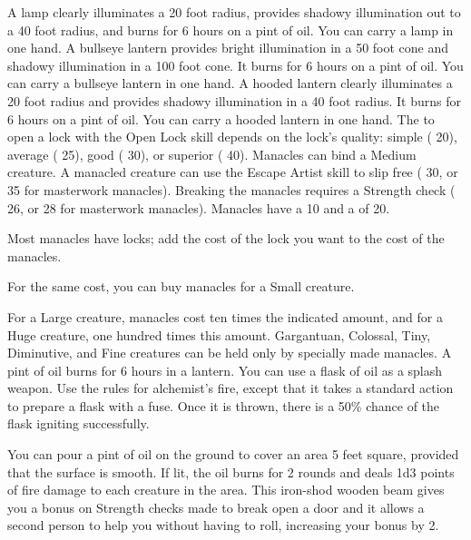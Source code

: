          A lamp clearly illuminates a 20 foot radius, provides shadowy illumination out to a 40 foot radius, and burns for 6 hours on a pint of oil. You can carry a lamp in one hand.
         A bullseye lantern provides bright illumination in a 50 foot cone and shadowy illumination in a 100 foot cone. It burns for 6 hours on a pint of oil. You can carry a bullseye lantern in one hand.
         A hooded lantern clearly illuminates a 20 foot radius and provides shadowy illumination in a 40 foot radius. It burns for 6 hours on a pint of oil. You can carry a hooded lantern in one hand.
         The  to open a lock with the Open Lock skill depends on the lock's quality: simple ( 20), average ( 25), good ( 30), or superior ( 40).
         Manacles can bind a Medium creature. A manacled creature can use the Escape Artist skill to slip free ( 30, or  35 for masterwork manacles). Breaking the manacles requires a Strength check ( 26, or  28 for masterwork manacles). Manacles have a  10 and a  of 20.
        \par Most manacles have locks; add the cost of the lock you want to the cost of the manacles.
        \par For the same cost, you can buy manacles for a Small creature.
        \par For a Large creature, manacles cost ten times the indicated amount, and for a Huge creature, one hundred times this amount. Gargantuan, Colossal, Tiny, Diminutive, and Fine creatures can be held only by specially made manacles.
         A pint of oil burns for 6 hours in a lantern. You can use a flask of oil as a splash weapon. Use the rules for alchemist's fire, except that it takes a standard action to prepare a flask with a fuse. Once it is thrown, there is a 50\% chance of the flask igniting successfully.
        \par You can pour a pint of oil on the ground to cover an area 5 feet square, provided that the surface is smooth. If lit, the oil burns for 2 rounds and deals 1d3 points of fire damage to each creature in the area.
         This iron-shod wooden beam gives you a  bonus on Strength checks made to break open a door and it allows a second person to help you without having to roll, increasing your bonus by 2.

